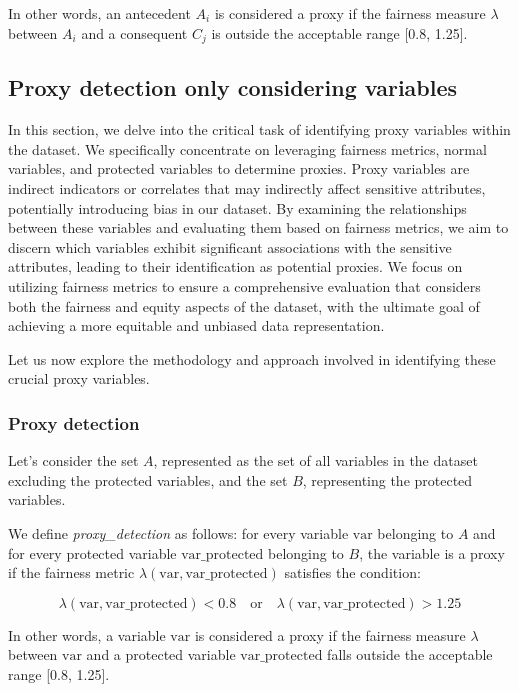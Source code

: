 \documentclass[12pt,a4paper,openright,twoside]{book}
\begin{document}
In other words, an antecedent \( A_i \) is considered a proxy if the fairness measure \( \lambda \) between \( A_i \) and a consequent \( C_j \) is outside the acceptable range [0.8, 1.25].

\subsection{Proxy detection only considering variables}
In this section, we delve into the critical task of identifying proxy variables within the dataset. We specifically concentrate on leveraging fairness metrics, normal variables, and protected variables to determine proxies. Proxy variables are indirect indicators or correlates that may indirectly affect sensitive attributes, potentially introducing bias in our dataset. By examining the relationships between these variables and evaluating them based on fairness metrics, we aim to discern which variables exhibit significant associations with the sensitive attributes, leading to their identification as potential proxies. We focus on utilizing fairness metrics to ensure a comprehensive evaluation that considers both the fairness and equity aspects of the dataset, with the ultimate goal of achieving a more equitable and unbiased data representation.

Let us now explore the methodology and approach involved in identifying these crucial proxy variables.

\subsubsection{Proxy detection}
Let's consider the set \( A \), represented as the set of all variables in the dataset excluding the protected variables, and the set \( B \), representing the protected variables.

We define \textit{proxy\_detection} as follows: for every variable \( \text{var} \) belonging to \( A \) and for every protected variable \( \text{var\_protected} \) belonging to \( B \), the variable is a proxy if the fairness metric \( \lambda(\text{var}, \text{var\_protected}) \) satisfies the condition:

\[
\lambda(\text{var}, \text{var\_protected}) < 0.8 \quad \text{or} \quad \lambda(\text{var}, \text{var\_protected}) > 1.25
\]

In other words, a variable \( \text{var} \) is considered a proxy if the fairness measure \( \lambda \) between \( \text{var} \) and a protected variable \( \text{var\_protected} \) falls outside the acceptable range [0.8, 1.25].
\end{document}

